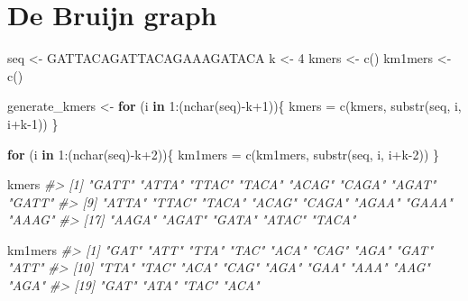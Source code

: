 \documentclass[
]{book}
\newenvironment{Shaded}{\begin{snugshade}}{\end{snugshade}}
\newcommand{\CommentTok}[1]{\textcolor[rgb]{0.56,0.35,0.01}{\textit{#1}}}
\newcommand{\ControlFlowTok}[1]{\textcolor[rgb]{0.13,0.29,0.53}{\textbf{#1}}}
\newcommand{\DecValTok}[1]{\textcolor[rgb]{0.00,0.00,0.81}{#1}}
\newcommand{\FunctionTok}[1]{\textcolor[rgb]{0.00,0.00,0.00}{#1}}
\newcommand{\NormalTok}[1]{#1}
\newcommand{\OtherTok}[1]{\textcolor[rgb]{0.56,0.35,0.01}{#1}}
\newcommand{\SpecialCharTok}[1]{\textcolor[rgb]{0.00,0.00,0.00}{#1}}
\newcommand{\StringTok}[1]{\textcolor[rgb]{0.31,0.60,0.02}{#1}}
\begin{document}
\hypertarget{bruijn}{%
\chapter{De Bruijn graph}\label{bruijn}}

\begin{Shaded}
\begin{Highlighting}[]
\NormalTok{seq     }\OtherTok{\textless{}{-}} \StringTok{\textquotesingle{}GATTACAGATTACAGAAAGATACA\textquotesingle{}}
\NormalTok{k       }\OtherTok{\textless{}{-}} \DecValTok{4}
\NormalTok{kmers   }\OtherTok{\textless{}{-}} \FunctionTok{c}\NormalTok{()}
\NormalTok{km1mers }\OtherTok{\textless{}{-}} \FunctionTok{c}\NormalTok{()}
\end{Highlighting}
\end{Shaded}

\begin{Shaded}
\begin{Highlighting}[]
\NormalTok{generate\_kmers }\OtherTok{\textless{}{-}}
\ControlFlowTok{for}\NormalTok{ (i }\ControlFlowTok{in} \DecValTok{1}\SpecialCharTok{:}\NormalTok{(}\FunctionTok{nchar}\NormalTok{(seq)}\SpecialCharTok{{-}}\NormalTok{k}\SpecialCharTok{+}\DecValTok{1}\NormalTok{))\{}
\NormalTok{  kmers }\OtherTok{=} \FunctionTok{c}\NormalTok{(kmers, }\FunctionTok{substr}\NormalTok{(seq, i, i}\SpecialCharTok{+}\NormalTok{k}\DecValTok{{-}1}\NormalTok{))}
\NormalTok{\}}

\ControlFlowTok{for}\NormalTok{ (i }\ControlFlowTok{in} \DecValTok{1}\SpecialCharTok{:}\NormalTok{(}\FunctionTok{nchar}\NormalTok{(seq)}\SpecialCharTok{{-}}\NormalTok{k}\SpecialCharTok{+}\DecValTok{2}\NormalTok{))\{}
\NormalTok{  km1mers }\OtherTok{=} \FunctionTok{c}\NormalTok{(km1mers, }\FunctionTok{substr}\NormalTok{(seq, i, i}\SpecialCharTok{+}\NormalTok{k}\DecValTok{{-}2}\NormalTok{))}
\NormalTok{\}}
\end{Highlighting}
\end{Shaded}

\begin{Shaded}
\begin{Highlighting}[]
\NormalTok{kmers}
\CommentTok{\#\textgreater{}  [1] "GATT" "ATTA" "TTAC" "TACA" "ACAG" "CAGA" "AGAT" "GATT"}
\CommentTok{\#\textgreater{}  [9] "ATTA" "TTAC" "TACA" "ACAG" "CAGA" "AGAA" "GAAA" "AAAG"}
\CommentTok{\#\textgreater{} [17] "AAGA" "AGAT" "GATA" "ATAC" "TACA"}
\end{Highlighting}
\end{Shaded}

\begin{Shaded}
\begin{Highlighting}[]
\NormalTok{km1mers}
\CommentTok{\#\textgreater{}  [1] "GAT" "ATT" "TTA" "TAC" "ACA" "CAG" "AGA" "GAT" "ATT"}
\CommentTok{\#\textgreater{} [10] "TTA" "TAC" "ACA" "CAG" "AGA" "GAA" "AAA" "AAG" "AGA"}
\CommentTok{\#\textgreater{} [19] "GAT" "ATA" "TAC" "ACA"}
\end{Highlighting}
\end{Shaded}
\end{document}
